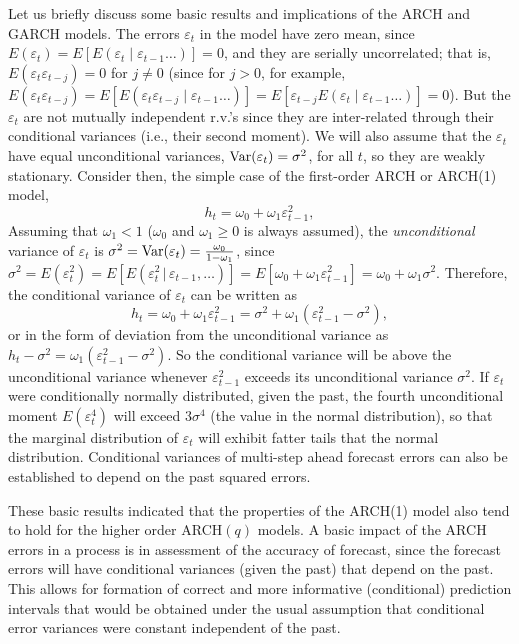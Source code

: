 Let us briefly discuss some basic results and implications of the ARCH and GARCH models. The errors $\varepsilon_t$ in the model have zero mean, since $E(\varepsilon_t) = E[E(\varepsilon_t \;|\; \varepsilon_{t-1} \ldots)] = 0$, and they are serially uncorrelated; that is, $E(\varepsilon_t \varepsilon_{t-j}) = 0$ for $j \not= 0$ (since for $j > 0$, for example, $E(\varepsilon_t \varepsilon_{t-j}) = E[E(\varepsilon_t \varepsilon_{t-j} \;|\; \varepsilon_{t-1} \ldots)] = E[\varepsilon_{t-j} E(\varepsilon_t \;|\; \varepsilon_{t-1} \ldots)] = 0$). But the $\varepsilon_t$ are not mutually independent r.v.'s since they are inter-related through their conditional variances (i.e., their second moment). We will also assume that the $\varepsilon_t$ have equal unconditional variances, $\operatorname{Var}(\varepsilon_t) = \sigma^2$, for all $t$, so they are weakly stationary. Consider then, the simple case of the first-order ARCH or ARCH(1) model,
	\begin{equation} \label{eqn:2htE}
	h_t = \omega_0 + \omega_1 \varepsilon_{t-1}^2,
	\end{equation}
Assuming that $\omega_1 < 1$ ($\omega_0$ and $\omega_1 \geq 0$ is always assumed), the \emph{unconditional} variance of $\varepsilon_t$ is $\sigma^2= \operatorname{Var}(\varepsilon_t) = \frac{\omega_0}{1 - \omega_1}$, since $\sigma^2 = E(\varepsilon_t^2) = E[E(\varepsilon_t^2 \,|\, \varepsilon_{t-1}, \ldots)] = E[\omega_0 + \omega_1\varepsilon_{t-1}^2] = \omega_0 + \omega_1\sigma^2$. Therefore, the conditional variance of $\varepsilon_t$ can be written as
	\begin{equation} \label{eqn:2htw}
	h_t = \omega_0 + \omega_1 \varepsilon_{t-1}^2 = \sigma^2 + \omega_1 (\varepsilon_{t-1}^2 - \sigma^2),
	\end{equation}
or in the form of deviation from the unconditional variance as $h_t - \sigma^2= \omega_1 (\varepsilon_{t-1}^2 - \sigma^2)$. So the conditional variance will be above the unconditional variance whenever $\varepsilon_{t-1}^2$ exceeds its unconditional variance $\sigma^2$. If $\varepsilon_t$ were conditionally normally distributed, given the past, the fourth unconditional moment $E(\varepsilon_t^4)$ will exceed $3 \sigma^4$ (the value in the normal distribution), so that the marginal distribution of $\varepsilon_t$ will exhibit fatter tails that the normal distribution. Conditional variances of multi-step ahead forecast errors can also be established to depend on the past squared errors. 


These basic results indicated that the properties of the ARCH(1) model also tend to hold for the higher order ARCH$(q)$ models. A basic impact of the ARCH errors in a process is in assessment of the accuracy of forecast, since the forecast errors will have conditional variances (given the past) that depend on the past. This allows for formation of correct and more informative (conditional) prediction intervals that would be obtained under the usual assumption that conditional error variances were constant independent of the past.



